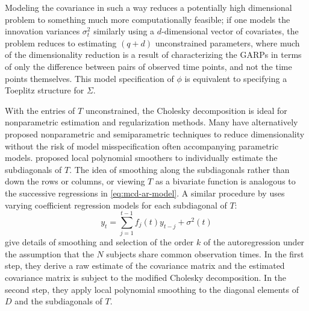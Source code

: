 \bigskip

Modeling the covariance in such a way reduces a potentially high dimensional problem to something much more computationally feasible; if one models the innovation variances $\sigma_t^2$ similarly using a $d$-dimensional vector of covariates, the problem reduces to estimating $\left(q+d\right)$ unconstrained parameters, where much of the dimensionality reduction is a result of characterizing the GARPs in terms of only the difference between pairs of observed time points, and not the time points themselves.  This model specification of $\phi$ is equivalent to specifying a Toeplitz structure for $\Sigma$.
\bigskip

With the entries of $T$ unconstrained, the Cholesky decomposition is ideal for nonparametric estimation and regularization methods. Many have alternatively proposed nonparametric and semiparametric techniques  to reduce dimensionality without the risk of model misspecification often accompanying parametric models.  \cite{wu2003nonparametric} proposed local polynomial smoothers to individually estimate the subdiagonals of $T$. The idea of smoothing along the subdiagonals rather than down the rows or columns, or viewing $T$ as a bivariate function is analogous to the successive regressions in \eqref{eq:mcd-ar-model}. A similar procedure by \cite{dahlhaus1997fitting} uses varying coefficient regression models for each subdiagonal of $T$:
\begin{equation} \label{eq:one-dimensional-mcd-vc-model}
y_t = \sum_{j = 1}^{t-1} f_{j}\left( t \right) y_{t-j} + \sigma^2\left(t\right)
\end{equation}
\cite{wu2003nonparametric} give details of smoothing and selection of the order $k$ of the autoregression under the assumption that the $N$ subjects share common observation times.  In the first step, they derive a raw estimate of the covariance matrix and the estimated covariance matrix is subject to the modified Cholesky decomposition. In the second step, they apply local polynomial smoothing to the diagonal elements of $D$ and the subdiagonals of $T$.  

\bigskip

